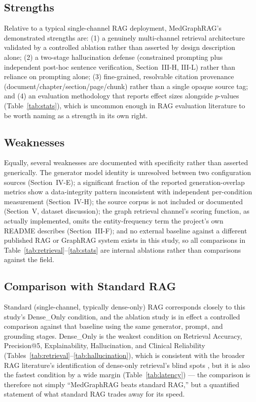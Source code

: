 \documentclass[conference]{IEEEtran}
\begin{document}
\subsection{Strengths}
Relative to a typical single-channel RAG deployment, MedGraphRAG's demonstrated strengths are: (1) a genuinely multi-channel retrieval architecture validated by a controlled ablation rather than asserted by design description alone; (2) a two-stage hallucination defense (constrained prompting plus independent post-hoc sentence verification, Section~III-H, III-L) rather than reliance on prompting alone; (3) fine-grained, resolvable citation provenance (document/chapter/section/page/chunk) rather than a single opaque source tag; and (4) an evaluation methodology that reports effect sizes alongside $p$-values (Table~\ref{tab:stats}), which is uncommon enough in RAG evaluation literature to be worth naming as a strength in its own right.

\subsection{Weaknesses}
Equally, several weaknesses are documented with specificity rather than asserted generically. The generator model identity is unresolved between two configuration sources (Section~IV-E); a significant fraction of the reported generation-overlap metrics show a data-integrity pattern inconsistent with independent per-condition measurement (Section~IV-H); the source corpus is not included or documented (Section~V, dataset discussion); the graph retrieval channel's scoring function, as actually implemented, omits the entity-frequency term the project's own README describes (Section~III-F); and no external baseline against a different published RAG or GraphRAG system exists in this study, so all comparisons in Table~\ref{tab:retrieval}--\ref{tab:stats} are internal ablations rather than comparisons against the field.

\subsection{Comparison with Standard RAG}
Standard (single-channel, typically dense-only) RAG \cite{lewis2020retrieval} corresponds closely to this study's Dense\_Only condition, and the ablation study is in effect a controlled comparison against that baseline using the same generator, prompt, and grounding stages. Dense\_Only is the weakest condition on Retrieval Accuracy, Precision@5, Explainability, Hallucination, and Clinical Reliability (Tables~\ref{tab:retrieval}--\ref{tab:hallucination}), which is consistent with the broader RAG literature's identification of dense-only retrieval's blind spots \cite{gao2024ragsurvey}, but it is also the fastest condition by a wide margin (Table~\ref{tab:latency}) --- the comparison is therefore not simply ``MedGraphRAG beats standard RAG,'' but a quantified statement of what standard RAG trades away for its speed.
\end{document}
